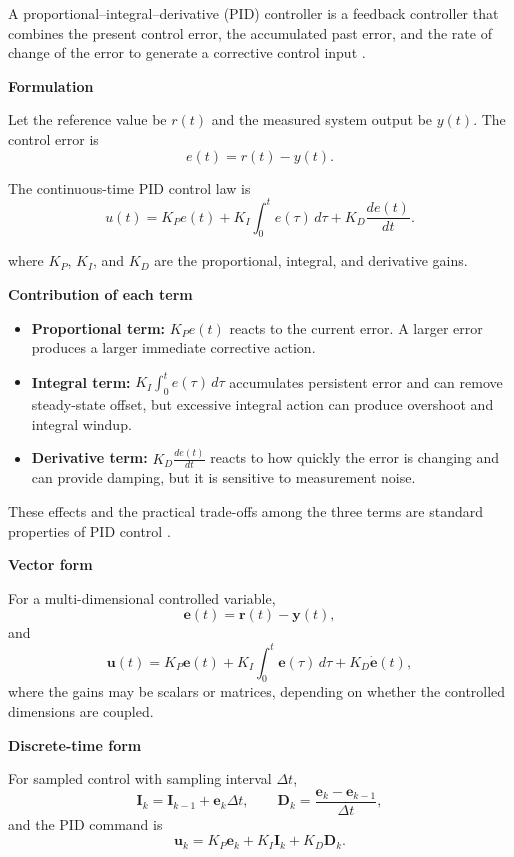 \documentclass{book}
\providecommand{\ProjectDeepHeading}[2]{%
    \par\medskip\noindent\textbf{#2}\par\smallskip
}
\begin{document}
A proportional--integral--derivative (PID) controller is a feedback controller that combines the present control error, the accumulated past error, and the rate of change of the error to generate a corrective control input \cite{astrom-2008-feedback-systems-an-introduction-for-scientists-and-engineers}.

   \ProjectDeepHeading{1}{Formulation}
      Let the reference value be $r(t)$ and the measured system output be $y(t)$. The control error is
      \[
         e(t)=r(t)-y(t).
      \]

      The continuous-time PID control law is
      \[
         u(t)
         =
         K_P e(t)
         +
         K_I \int_{0}^{t} e(\ensuremath{\tau})\,d\ensuremath{\tau}
         +
         K_D \frac{de(t)}{dt}.
      \]

      where $K_P$, $K_I$, and $K_D$ are the proportional, integral, and derivative gains.

   \ProjectDeepHeading{2}{Contribution of each term}
      \begin{itemize}
         \item \textbf{Proportional term:} $K_P e(t)$ reacts to the current error. A larger error produces a larger immediate corrective action.
         \item \textbf{Integral term:} $K_I \int_0^t e(\ensuremath{\tau})\,d\ensuremath{\tau}$ accumulates persistent error and can remove steady-state offset, but excessive integral action can produce overshoot and integral windup.
         \item \textbf{Derivative term:} $K_D \frac{de(t)}{dt}$ reacts to how quickly the error is changing and can provide damping, but it is sensitive to measurement noise.
      \end{itemize}
      These effects and the practical trade-offs among the three terms are standard properties of PID control \cite{astrom-2008-feedback-systems-an-introduction-for-scientists-and-engineers}.

   \ProjectDeepHeading{2}{Vector form}
      For a multi-dimensional controlled variable,
      \[
         \mathbf{e}(t)
         =
         \mathbf{r}(t)-\mathbf{y}(t),
      \]
      and
      \[
         \mathbf{u}(t)
         =
         K_P\mathbf{e}(t)
         +
         K_I\int_0^t\mathbf{e}(\ensuremath{\tau})\,d\ensuremath{\tau}
         +
         K_D\dot{\mathbf{e}}(t),
      \]
      where the gains may be scalars or matrices, depending on whether the controlled dimensions are coupled.

   \ProjectDeepHeading{2}{Discrete-time form}
      For sampled control with sampling interval $\ensuremath{\Delta} t$,
      \[
         \mathbf{I}_k
         =
         \mathbf{I}_{k-1}
         +
         \mathbf{e}_k\ensuremath{\Delta} t,
         \qquad
         \mathbf{D}_k
         =
         \frac{\mathbf{e}_k-\mathbf{e}_{k-1}}{\ensuremath{\Delta} t},
      \]
      and the PID command is
      \[
         \mathbf{u}_k
         =
         K_P\mathbf{e}_k
         +
         K_I\mathbf{I}_k
         +
         K_D\mathbf{D}_k.
      \]
\end{document}
